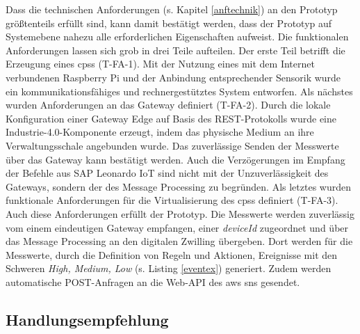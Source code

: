 Dass die technischen Anforderungen (s. Kapitel \ref{anftechnik}) an den Prototyp größtenteils erfüllt sind, kann damit bestätigt werden, dass der Prototyp auf Systemebene nahezu alle erforderlichen Eigenschaften aufweist. Die funktionalen Anforderungen lassen sich grob in drei Teile aufteilen. Der erste Teil betrifft die Erzeugung eines \ac{cpss} (T-FA-1). Mit der Nutzung eines mit dem Internet verbundenen Raspberry Pi und der Anbindung entsprechender Sensorik wurde ein kommunikationsfähiges und rechnergestütztes System entworfen. Als nächstes wurden Anforderungen an das Gateway definiert  (T-FA-2). Durch die lokale Konfiguration einer Gateway Edge auf Basis des REST-Protokolls wurde eine Industrie-4.0-Komponente erzeugt, indem das physische Medium an ihre Verwaltungsschale angebunden wurde. Das zuverlässige Senden der Messwerte über das Gateway kann bestätigt werden. Auch die Verzögerungen im Empfang der Befehle aus SAP Leonardo IoT sind nicht mit der Unzuverlässigkeit des Gateways, sondern der des Message Processing zu begründen. Als letztes wurden funktionale Anforderungen für die Virtualisierung des \ac{cpss} definiert (T-FA-3). Auch diese Anforderungen erfüllt der Prototyp. Die Messwerte werden zuverlässig vom einem eindeutigen Gateway empfangen, einer \textit{deviceId} zugeordnet und über das Message Processing an den digitalen Zwilling übergeben. Dort werden für die Messwerte, durch die Definition von Regeln und Aktionen, Ereignisse mit den Schweren \textit{High, Medium, Low} (s. Listing \ref{eventex}) generiert. Zudem werden automatische POST-Anfragen an die Web-API des \ac{aws} \ac{sns} gesendet.

\subsection{Handlungsempfehlung}

